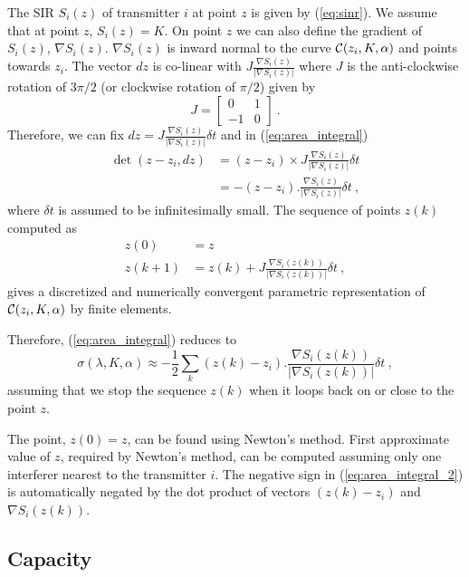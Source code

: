 \documentclass[12pt,english]{article}
\begin{document}
The SIR $S_{i}(z)$ of transmitter $i$ at point $z$ is given by (\ref{eq:sinr}).
We assume that at point $z$, $S_{i}(z)=K$. On point $z$ we can also define the gradient of $S_{i}(z)$, $\nabla S_{i}(z)$.
$\nabla S_i(z)$ is inward normal to the curve ${\cal C}(z_i,K,\alpha)$ and points towards $z_i$. The vector $dz$ is co-linear with $J\frac{\nabla S_{i}(z)}{|\nabla S_{i}(z)|}$ where $J$ is the anti-clockwise rotation of $3\pi/2$ (or clockwise rotation of $\pi/2$) given by
$$
J=\left[\begin{array}{cc}
0 & 1\\
-1 & 0\end{array}\right]~.
$$ 
Therefore, we can fix $dz=J\frac{\nabla S_{i}(z)}{|\nabla S_{i}(z)|}\delta t$ and in (\ref{eq:area_integral}) 
\begin{align*}
\det(z-z_{i},dz)&=(z-z_i)\times J\frac{\nabla S_{i}(z)}{|\nabla S_{i}(z)|}\delta t\\
&=-(z-z_{i}).\frac{\nabla S_{i}(z)}{|\nabla S_{i}(z)|}\delta t~,
\end{align*}
where $\delta t$ is assumed to be infinitesimally small. The sequence of points $z(k)$ computed as 
\begin{align*}
z(0) & =z\\
z(k+1) & =z(k)+J\frac{\nabla S_{i}(z(k))}{|\nabla S_{i}(z(k))|}\delta t~,\end{align*} gives a discretized and numerically convergent parametric representation of ${\cal C}(z_i,K,\alpha)$ by finite elements. 

Therefore, (\ref{eq:area_integral}) reduces to
\begin{equation}
\sigma(\lambda, K,\alpha)\approx-\frac{1}{2}\sum_{k}(z(k)-z_{i}).\frac{\nabla S_{i}(z(k))}{|\nabla S_{i}(z(k))|}\delta t~,
\label{eq:area_integral_2}
\end{equation}
assuming that we stop the sequence $z(k)$ when it loops back on or close to the point $z$. 

The point, \mbox{$z(0)=z$}, can be found using Newton's method. First approximate value of $z$, required by Newton's method, can be computed assuming only one interferer nearest to the transmitter $i$. The negative sign in (\ref{eq:area_integral_2}) is automatically negated by the dot product of vectors $(z(k)-z_{i})$ and $\nabla S_{i}(z(k))$.

\subsection{Capacity}
\end{document}
